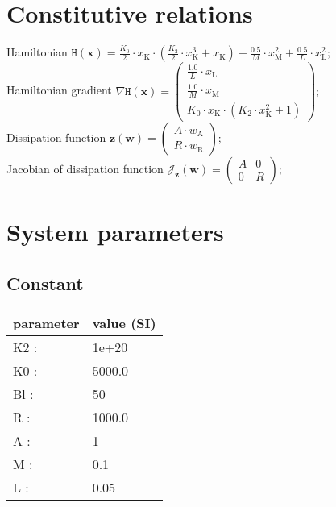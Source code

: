 \documentclass[11pt, oneside]{article}      %
\begin{document}
\section{Constitutive relations}
%
Hamiltonian $ \mathtt{H}(\mathbf{x}) = \frac{K_{0}}{2} \cdot x_{\mathrm{K}} \cdot \left(\frac{K_{2}}{2} \cdot x_{\mathrm{K}}^{3} + x_{\mathrm{K}}\right) + \frac{0.5}{M} \cdot x_{\mathrm{M}}^{2} + \frac{0.5}{L} \cdot x_{\mathrm{L}}^{2} ; $ 
%
\\
%
Hamiltonian gradient $ \nabla \mathtt{H}(\mathbf{x}) = \left(\begin{array}{c}\frac{1.0}{L} \cdot x_{\mathrm{L}}\\\frac{1.0}{M} \cdot x_{\mathrm{M}}\\K_{0} \cdot x_{\mathrm{K}} \cdot \left(K_{2} \cdot x_{\mathrm{K}}^{2} + 1\right)\end{array}\right) ; $ 
%
\\
%
Dissipation function $ \mathbf{z}(\mathbf{w}) = \left(\begin{array}{c}A \cdot w_{\mathrm{A}}\\R \cdot w_{\mathrm{R}}\end{array}\right) ; $ 
%
\\
%
Jacobian of dissipation function $ \mathcal{J}_{\mathbf{z}}(\mathbf{w}) = \left(\begin{array}{cc}A & 0\\0 & R\end{array}\right) ; $ 
%
\\
%
%
\section{System parameters}
%
%
\subsection{Constant}
%
\begin{center}
%
\begin{tabular}{ll}
%
\hline
parameter & value (SI)
\\ \hline
K2 :& 1e+20
\\
K0 :& 5000.0
\\
Bl :& 50
\\
R :& 1000.0
\\
A :& 1
\\
M :& 0.1
\\
L :& 0.05
\\
\hline
\end{tabular}
%
\end{center}
%
\end{document}
